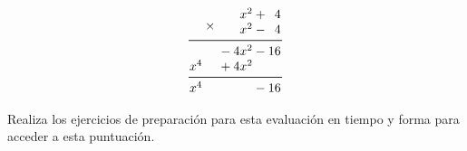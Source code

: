 \documentclass[11pt,addpoints]{exam}
\begin{document}
\begin{questions}
\begin{parts}
        \begin{minipage}[c]{0.8\linewidth}
            \begin{solutionbox}{6cm}
                \begin{minipage}[c]{0.5\linewidth}
                    \[ \begin{array}{*{12}{@{}>{{}}r<{{}}@{}}}
                                                                   &  &  &     &  & \multirow{2.5}{*}{$ {}\times{} $} &   & x^2  &  & + & 4  & \\
                                                                   &  &  &     &  &                                   &   & x^2  &  & - & 4  & \\
                            \cmidrule[0.6pt](l{-1pt}r{-1pt}){1-12}
                                                                   &  &  &     &  &                                   & - & 4x^2 &  & - & 16 & \\
                                                                   &  &  & x^4 &  &                                   & + & 4x^2 &  &   &    & \\
                            \cmidrule[0.6pt](l{-1pt}r{-1pt}){1-12} &  &  & x^4 &  &                                   &   &      &  & - & 16 &
                        \end{array}
                    \]
                \end{minipage}
            \end{solutionbox}
        \end{minipage}
    \end{parts}

    \question[20] Realiza los ejercicios de preparaci\'on para esta evaluaci\'on en tiempo y forma para acceder a esta puntuaci\'on. 
\end{questions}
\end{document}
